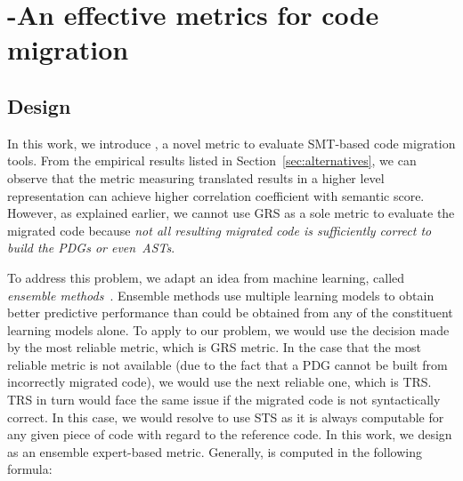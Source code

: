 \section{{\model}-An effective metrics for code migration}
\label{sec:proposal}


\subsection{Design}

%

In this work, we introduce {\model}, a novel metric to evaluate
SMT-based code migration tools.  From the empirical results
listed in Section~\ref{sec:alternatives}, we can observe that the
metric measuring translated results in a higher level representation
can achieve higher correlation coefficient with semantic score.
However, as explained earlier, we cannot use GRS as a sole metric to
evaluate the migrated code because {\em not all resulting migrated
code is sufficiently correct to build the PDGs or even~ASTs}.

To address this problem, we adapt an idea from machine learning,
called {\em ensemble methods}~\cite{ensemble}. Ensemble methods
use multiple learning models to obtain better
predictive performance than could be obtained from any of the
constituent learning models alone.
To apply to our problem, we would use the decision made by the most
reliable metric, which is GRS metric. In the case that the most
reliable metric is not available (due to the fact that a PDG cannot
be built from incorrectly migrated code), we would use the next
reliable one, which is TRS. TRS in turn would face the same issue if
the migrated code is not syntactically correct. In this case, we would
resolve to use STS as it is always computable for any given piece of
code with regard to the reference code. In this work, we design 
{\model} as an ensemble expert-based metric. Generally, {\model} is 
computed in the following formula:

